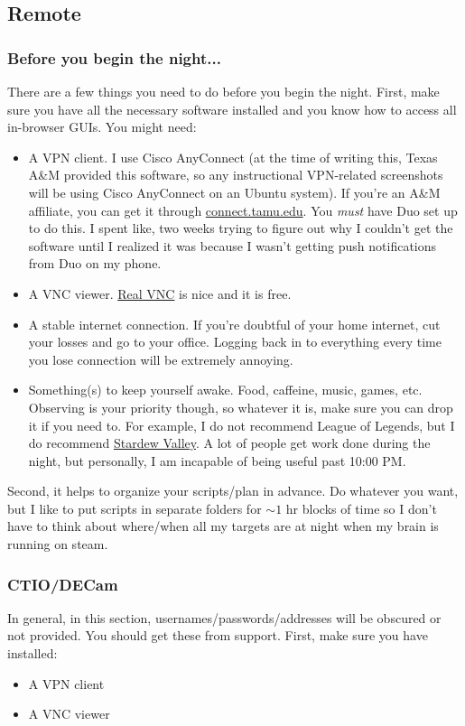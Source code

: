\subsection{Remote}
\subsubsection{Before you begin the night...}
There are a few things you need to do before you begin the night. First, make sure you have all the necessary software installed and you know how to access all in-browser GUIs. You might need:
\begin{itemize}
    \item A VPN client. I use Cisco AnyConnect (at the time of writing this, Texas A\&M provided this software, so any instructional VPN-related screenshots will be using Cisco AnyConnect on an Ubuntu system). If you're an A\&M affiliate, you can get it through \href{connect.tamu.edu}{connect.tamu.edu}. You \textit{must} have Duo set up to do this. I spent like, two weeks trying to figure out why I couldn't get the software until I realized it was because I wasn't getting push notifications from Duo on my phone. 
    \item A VNC viewer. \href{https://www.realvnc.com/en/connect/download/viewer/}{Real VNC} is nice and it is free. 
    \item A stable internet connection. If you're doubtful of your home internet, cut your losses and go to your office. Logging back in to everything every time you lose connection will be extremely annoying. 
    \item Something(s) to keep yourself awake. Food, caffeine, music, games, etc. Observing is your priority though, so whatever it is, make sure you can drop it if you need to. For example, I do not recommend League of Legends, but I do recommend \href{https://www.stardewvalley.net/}{Stardew Valley}. A lot of people get work done during the night, but personally, I am incapable of being useful past 10:00 PM. 
\end{itemize}
\par
Second, it helps to organize your scripts/plan in advance. Do whatever you want, but I like to put scripts in separate folders for $\sim1$ hr blocks of time so I don't have to think about where/when all my targets are at night when my brain is running on steam. 

\subsubsection{CTIO/DECam}
\par
In general, in this section, usernames/passwords/addresses will be obscured or not provided. You should get these from support. First, make sure you have installed:
\begin{itemize}
    \item A VPN client
    \item A VNC viewer
\end{itemize}

